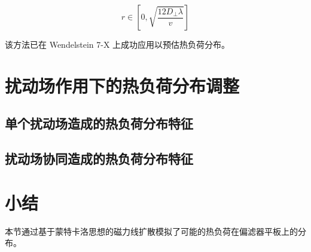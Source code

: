 \begin{equation}
    r \in[0, \sqrt{\frac{12 D_{\perp} \lambda}{v}}]
\end{equation}

该方法已在 Wendelstein 7-X 上成功应用以预估热负荷分布。

\section{扰动场作用下的热负荷分布调整}

\subsection{单个扰动场造成的热负荷分布特征}

\subsection{扰动场协同造成的热负荷分布特征}


\section{小结}

本节通过基于蒙特卡洛思想的磁力线扩散模拟了可能的热负荷在偏滤器平板上的分布。